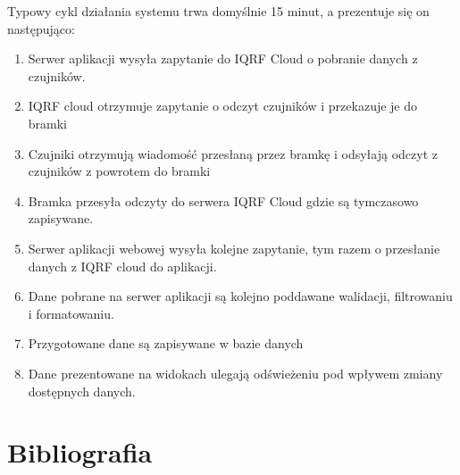 \documentclass[a4paper, 12pt]{article}
\begin{document}
Typowy cykl działania systemu trwa domyślnie 15 minut, a prezentuje się on następująco:

\begin{enumerate}
    \item Serwer aplikacji wysyła zapytanie do IQRF Cloud o pobranie danych z czujników.
    \item IQRF cloud otrzymuje zapytanie o odczyt czujników i przekazuje je do bramki
    \item Czujniki otrzymują wiadomość przesłaną przez bramkę i odsyłają odczyt z czujników z powrotem do bramki
    \item Bramka przesyła odczyty do serwera IQRF Cloud gdzie są tymczasowo zapisywane.
    \item Serwer aplikacji webowej wysyła kolejne zapytanie, tym razem o przesłanie danych z IQRF cloud
do aplikacji.
    \item Dane pobrane na serwer aplikacji są kolejno poddawane walidacji, filtrowaniu i formatowaniu.
    \item Przygotowane dane są zapisywane w bazie danych 
    \item Dane prezentowane na widokach ulegają odświeżeniu pod wpływem zmiany dostępnych danych.
\end{enumerate}

\section{Bibliografia}

\printbibliography
\end{document}
